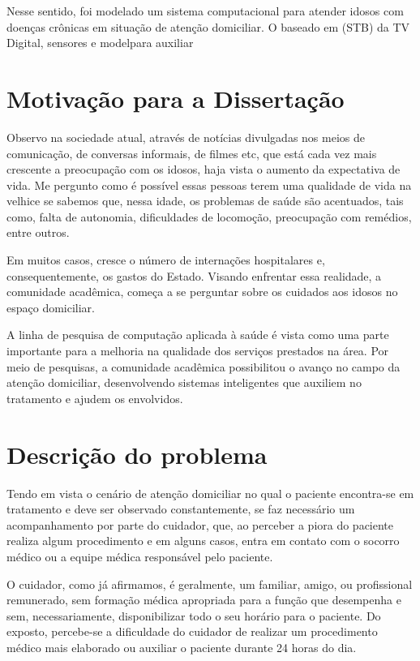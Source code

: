 Nesse sentido, foi modelado um sistema computacional para atender idosos com
doenças crônicas em situação de atenção domiciliar. O baseado em \stb[] (STB)
da TV Digital, sensores e modelpara auxiliar

\section{Motivação para a Dissertação}\label{sec:motivacao}

Observo na sociedade atual, através de notícias divulgadas nos meios
de comunicação, de conversas informais, de filmes etc, que está cada
vez mais crescente a preocupação com os idosos, haja vista o
aumento da expectativa de vida. Me pergunto como é possível essas pessoas
terem uma qualidade de vida na velhice se sabemos que, nessa idade,
os problemas de saúde são acentuados, tais como, falta de autonomia,
dificuldades de locomoção, preocupação com remédios, entre outros.

Em muitos casos, cresce o número de internações hospitalares e,
consequentemente, os gastos do Estado. Visando enfrentar essa 
realidade, a comunidade acadêmica, %
começa a se perguntar sobre os cuidados aos idosos no espaço domiciliar.

A linha de pesquisa de computação aplicada à saúde é vista como uma parte
importante para a melhoria na qualidade dos serviços prestados na área. Por meio
de pesquisas, a comunidade acadêmica possibilitou o avanço no campo da atenção
domiciliar, desenvolvendo sistemas inteligentes que auxiliem no tratamento e
ajudem os envolvidos.

\section{Descrição do problema}\label{sec:descricao-problema}

Tendo em vista o cenário de atenção domiciliar no qual o paciente
encontra-se em tratamento e deve ser observado constantemente, 
se faz necessário um acompanhamento por parte do cuidador, que, ao perceber 
a piora do paciente realiza algum procedimento e em alguns casos, entra 
em contato com o socorro médico ou a equipe médica responsável pelo paciente.

O cuidador, como já afirmamos, é geralmente, um familiar, amigo, ou profissional
remunerado, sem formação médica apropriada para a função que desempenha  e sem,
necessariamente, disponibilizar todo o seu horário para o paciente. Do exposto,
percebe-se a dificuldade do cuidador de realizar um procedimento médico mais
elaborado ou auxiliar o paciente durante 24 horas do dia.


